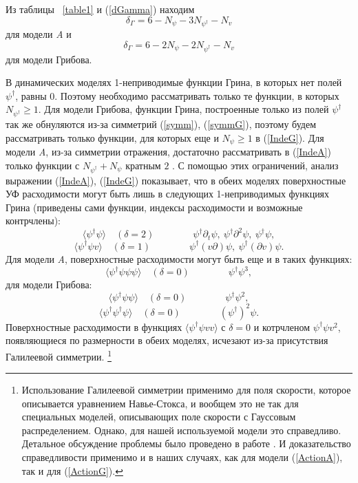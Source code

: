 \documentclass[a4paper,10pt]{article}
\begin{document}
Из таблицы ~\ref{table1} и (\ref{dGamma}) находим
\begin{equation}
\delta_{\Gamma}= 6 - N_{\psi} - 3N_{\psi^{\dag}} - N_{v}
\label{IndeA}
\end{equation}
для модели {\it A} и
\begin{equation}
\delta_{\Gamma}= 6 - 2N_{\psi} - 2N_{\psi^{\dag}} - N_{v}
\label{IndeG}
\end{equation}
для модели Грибова.

В динамических моделях 1-неприводимые функции Грина, в которых нет полей
$\psi^{\dag}$, равны $0$. Поэтому необходимо рассматривать только те функции, в которых  $N_{\psi^{\dag}} \ge 1$.
Для модели Грибова, функции Грина, построенные только из полей $\psi^{\dag}$ так же обнуляются из-за симметрий
(\ref{symm}), (\ref{symmG}), поэтому будем рассматривать только функции, для которых еще и $N_{\psi}\ge1$
в (\ref{IndeG}). Для модели {\it A}, из-за симметрии отражения,
достаточно рассматривать в  (\ref{IndeA}) только функции с $N_{\psi^{\dag}}+N_{\psi}$ кратным $2$ . С помощью этих ограничений, анализ выражении  (\ref{IndeA}), (\ref{IndeG})
показывает, что в обеих моделях поверхностные УФ расходимости могут быть лишь в следующих 1-неприводимых функциях Грина (приведены сами функции,
индексы расходимости и возможные контрчлены):
\[ \langle \psi^{\dag} \psi \rangle \quad (\delta=2) \quad
 \quad \quad \quad \psi^{\dag}\partial_{t}\psi, \
\psi^{\dag}\partial^{2}\psi, \ \psi^{\dag}\psi, \]
\[ \langle \psi^{\dag} \psi v \rangle \quad (\delta=1) \quad
  \quad \quad  \quad \psi^{\dag} (v\partial) \psi, \
\psi^{\dag} (\partial v) \psi.  \]
Для модели {\it A}, поверхностные расходимости могут быть еще и в таких функциях:
\[ \langle \psi^{\dag} \psi\psi\psi \rangle \quad (\delta=0) \quad
  \quad  \quad \quad \psi^{\dag} \psi^{3}, \]
для модели Грибова:
\[ \langle \psi^{\dag} \psi\psi \rangle \quad (\delta=0) \quad
  \quad \quad  \quad \psi^{\dag} \psi^{2}, \]
\[ \langle \psi^{\dag} \psi^{\dag}\psi \rangle \quad (\delta=0) \quad
  \quad \quad \quad (\psi^{\dag})^{2} \psi. \]
Поверхностные расходимости в функциях
$\langle \psi^{\dag} \psi vv \rangle$ с $\delta=0$ и котрчленом $\psi^{\dag} \psi v^{2}$, появляющиеся по размерности в обеих моделях, исчезают из-за присутствия Галилеевой симметрии.
\footnote{Использование Галилеевой симметрии применимо для поля скорости, которое описывается уравнением Навье-Стокса,
и вообщем это не так для специальных моделей, описывающих поле скорости с Гауссовым распределением.
Однако, для нашей используемой модели это справедливо. Детальное обсуждение проблемы было проведено в работе \cite{Alexa}. И доказательство справедливости применимо и в наших случаях, как
для модели (\ref{ActionA}), так и для  (\ref{ActionG}).}
\end{document}
